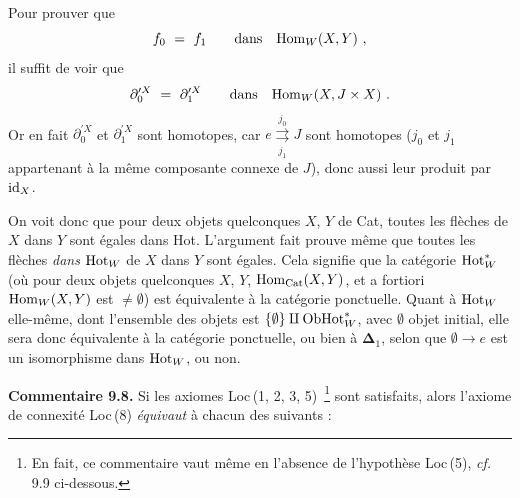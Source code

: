 Pour prouver que
\[
f_0\ =\ f_1\qquad\text{dans}\quad\Hom_W(X,Y)\ ,
\]
il suffit de voir que
\[
\partial_0^{\prime X}\ =\ \partial_1^{\prime X}\qquad\text{dans}\quad\Hom_W(X,J\times X)\ .
\]
Or en fait $\partial_0^{\prime X}$ et $\partial_1^{\prime X}$ sont homotopes, car $e\underset{j_1}{\overset{j_0}{\rightrightarrows}}J$ sont homotopes ($j_0$ et $j_1$ appartenant à la même composante connexe de $J$), donc aussi leur produit par $\mathrm{id}_X$.

On voit donc que pour deux objets quelconques $X$, $Y$ de Cat, toutes les flèches de $X$ dans $Y$ sont égales dans Hot. L'argument fait prouve même que toutes les flèches \textit{dans} $\mathrm{Hot}_W$ de $X$ dans $Y$ sont égales. Cela signifie que la catégorie $\mathrm{Hot}_W^*$ (où pour deux objets quelconques $X$, $Y$, $\mathrm{Hom}_{\mathrm{Cat}}(X,Y)$, et a fortiori $\mathrm{Hom}_W(X,Y)$ est $\neq\emptyset$) est équivalente à la catégorie ponctuelle. Quant à $\mathrm{Hot}_W$ elle-même, dont l'ensemble des objets est $\{\emptyset\}\amalg\mathrm{Ob}\mathrm{Hot}_W^*$, avec $\emptyset$ objet initial, elle sera donc équivalente à la catégorie ponctuelle, ou bien à $\boldsymbol{\Delta}_1$, selon que $\emptyset\longrightarrow e$ est un isomorphisme dans $\mathrm{Hot}_W$, ou non.

\textbf{Commentaire 9.8.} Si les axiomes Loc\,(1, 2, 3, 5)~\footnote[52]{En fait, ce commentaire vaut même en l'absence de l'hypothèse Loc\,(5), \textit{cf.} 9.9 ci-dessous.} sont satisfaits, alors l'axiome de connexité Loc\,(8) \textit{équivaut} à chacun des suivants :

